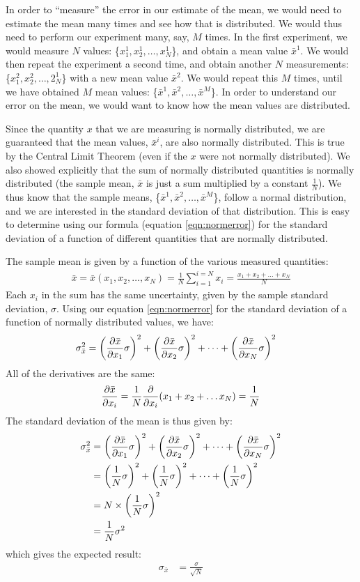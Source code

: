 In order to ``measure'' the error in our estimate of the mean, we would need to estimate the mean many times and see how that is distributed. We would thus need to perform our experiment many, say, $M$ times. In the first experiment, we would measure $N$ values: \{$x^1_1, x^1_2, \dots,x^1_N$\}, and obtain a mean value $\bar x^1$. We would then repeat the experiment a second time, and obtain another $N$ measurements:  \{$x^2_1, x^2_2, \dots,2^1_N$\} with a new mean value $\bar x^2$. We would repeat this $M$ times, until we have obtained $M$ mean values: \{$\bar x^1, \bar x^2, \dots, \bar x^M$\}. In order to understand our error on the mean, we would want to know how the mean values are distributed.

Since the quantity $x$ that we are measuring is normally distributed, we are guaranteed that the mean values, $\bar x^i$, are also normally distributed. This is true by the Central Limit Theorem (even if the $x$ were not normally distributed). We also showed explicitly that the sum of normally distributed quantities is normally distributed (the sample mean, $\bar x$ is just a sum multiplied by a constant $\frac{1}{N}$). We thus know that the sample means, \{$\bar x^1, \bar x^2, \dots, \bar x^M$\}, follow a normal distribution, and we are interested in the standard deviation of that distribution. This is easy to determine using our formula (equation \ref{eqn:normerror}) for the standard deviation of a function of different quantities that are normally distributed.

The sample mean is given by a function of the various measured quantities:
\begin{align}
\bar{x} =\bar x(x_1,x_2,\dots,x_N)= \frac{1}{N} \sum_{i=1}^{i=N} x_i =\frac{x_1+x_2+\dots+x_N}{N}
\end{align}
Each $x_i$ in the sum has the same uncertainty, given by the sample standard deviation, $\sigma$. Using our equation \ref{eqn:normerror} for the standard deviation of a function of normally distributed values, we have:
\begin{align*}
\sigma_{\bar x}^2&=\left(\frac{\partial \bar x}{\partial x_1}\sigma\right)^2+\left(\frac{\partial \bar x}{\partial x_2}\sigma\right)^2+\dots+\left(\frac{\partial \bar x}{\partial x_N}\sigma\right)^2
\end{align*}
All of the derivatives are the same:
\begin{align*}
\frac{\partial \bar x}{\partial x_i}=\frac{1}{N}\frac{\partial }{\partial x_i}(x_1+x_2+\dots x_N)=\frac{1}{N}
\end{align*}
The standard deviation of the mean is thus given by:
\begin{align}
\sigma_{\bar x}^2&=\left(\frac{\partial \bar x}{\partial x_1}\sigma\right)^2+\left(\frac{\partial \bar x}{\partial x_2}\sigma\right)^2+\dots+\left(\frac{\partial \bar x}{\partial x_N}\sigma\right)^2\nonumber\\
&=\left(\frac{1}{N}\sigma\right)^2+\left(\frac{1}{N}\sigma\right)^2+\dots+\left(\frac{1}{N}\sigma\right)^2\nonumber\\
&=N\times\left(\frac{1}{N}\sigma\right)^2\nonumber\\
&=\frac{1}{N}\sigma^2
\end{align}
which gives the expected result:
\begin{align}
\sigma_{\bar x}&=\frac{\sigma}{\sqrt{N}}
\end{align}

